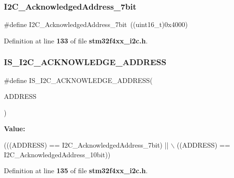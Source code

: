 \subsubsection{I2\+C\+\_\+\+Acknowledged\+Address\+\_\+7bit}
{\footnotesize\ttfamily \#define I2\+C\+\_\+\+Acknowledged\+Address\+\_\+7bit~((uint16\+\_\+t)0x4000)}



Definition at line \textbf{ 133} of file \textbf{ stm32f4xx\+\_\+i2c.\+h}.

\mbox{\label{group__I2C__acknowledged__address_ga26a3af0a468f7226ed72fde27528c0ba}} 
\subsubsection{I\+S\+\_\+\+I2\+C\+\_\+\+A\+C\+K\+N\+O\+W\+L\+E\+D\+G\+E\+\_\+\+A\+D\+D\+R\+E\+SS}
{\footnotesize\ttfamily \#define I\+S\+\_\+\+I2\+C\+\_\+\+A\+C\+K\+N\+O\+W\+L\+E\+D\+G\+E\+\_\+\+A\+D\+D\+R\+E\+SS(\begin{DoxyParamCaption}\item[{}]{A\+D\+D\+R\+E\+SS }\end{DoxyParamCaption})}

{\bfseries Value\+:}
\begin{DoxyCode}
(((ADDRESS) == I2C_AcknowledgedAddress_7bit) || \(\backslash\)
                                             ((ADDRESS) == 
      I2C_AcknowledgedAddress_10bit))
\end{DoxyCode}


Definition at line \textbf{ 135} of file \textbf{ stm32f4xx\+\_\+i2c.\+h}.

